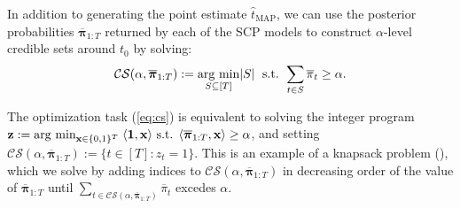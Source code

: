 In addition to generating the point estimate $\hat{t}_\text{MAP}$, we can use the posterior probabilities $\overline{\boldsymbol{\pi}}_{1:T}$ returned by each of the SCP models to construct $\alpha$-level credible sets around $t_0$ by solving:
\begin{align}\label{eq:cs}
    \mathcal{CS}(\alpha, \overline{\boldsymbol{\pi}}_{1:T}) := \underset{S \subseteq[T]}{\text{\normalfont arg min}} |S| \;\text{ s.t. } \sum_{t \in S} \overline{\pi}_t \geq \alpha.
\end{align}
\begin{remark}\label{rmk:knapsack}
    The optimization task (\ref{eq:cs}) is equivalent to solving the integer program $\mathbf{z} := \text{\normalfont arg min}_{\mathbf{x}\in\{0,1\}^T} \; \langle\mathbf{1}, \mathbf{x}\rangle \text{ s.t. } \langle \overline{\boldsymbol{\pi}}_{1:T}, \mathbf{x}\rangle \geq \alpha$, and setting $\mathcal{CS}(\alpha, \overline{\boldsymbol{\pi}}_{1:T}) := \{t \in [T]: z_t = 1\}$. This is an example of a knapsack problem (\citealp{Santini24}), which we solve by adding indices to $\mathcal{CS}(\alpha, \overline{\boldsymbol{\pi}}_{1:T})$ in decreasing order of the value of $\overline{\boldsymbol{\pi}}_{1:T}$ until $\sum_{t \in \mathcal{CS}(\alpha, \overline{\boldsymbol{\pi}}_{1:T})} \overline{\pi}_t$ excedes $\alpha$. 
\end{remark}
\vspace{-5pt}

